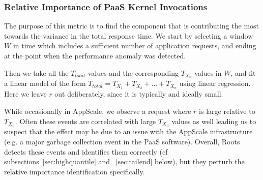 
\subsubsection{Relative Importance of PaaS Kernel Invocations} 

The purpose of this metric is to find the component that is contributing 
the most towards the variance in the total response time. 
We start by selecting a window $W$ in time which includes a sufficient number of application requests,
and ending at the point when the performance anomaly was detected. 

Then we take all the $T_{total}$ values
and the corresponding $T_{X_n}$ values in $W$, and fit 
a linear model of the form 
$T_{total} = T_{X_1} + T_{X_2} + ... + T_{X_n}$
using linear regression. Here we leave $r$ out
deliberately, since it is typically and ideally small. 

While occasionally in AppScale, we observe a request where $r$ is
large relative to $T_{X_n}$.  Often these events are correlated with large
$T_{X_n}$ values as well leading us to suspect that the effect may be due to
an issue with the AppScale infrastructure (e.g. a major garbage collection
event in the PaaS software).  Overall, Roots detects these events and identifies them correctly (cf
subsections~\ref{sec:highquantile} and ~\ref{sec:tailend} below), but they
perturb the relative importance identification specifically.


